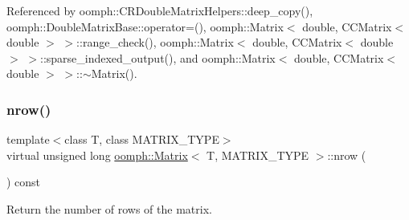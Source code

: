Referenced by oomph\+::\+C\+R\+Double\+Matrix\+Helpers\+::deep\+\_\+copy(), oomph\+::\+Double\+Matrix\+Base\+::operator=(), oomph\+::\+Matrix$<$ double, C\+C\+Matrix$<$ double $>$ $>$\+::range\+\_\+check(), oomph\+::\+Matrix$<$ double, C\+C\+Matrix$<$ double $>$ $>$\+::sparse\+\_\+indexed\+\_\+output(), and oomph\+::\+Matrix$<$ double, C\+C\+Matrix$<$ double $>$ $>$\+::$\sim$\+Matrix().

\mbox{\label{classoomph_1_1Matrix_ac366ca5324d3e00e23d9800f3d5f4d5f}} 
\subsubsection{\texorpdfstring{nrow()}{nrow()}}
{\footnotesize\ttfamily template$<$class T, class M\+A\+T\+R\+I\+X\+\_\+\+T\+Y\+PE$>$ \\
virtual unsigned long \hyperlink{classoomph_1_1Matrix}{oomph\+::\+Matrix}$<$ T, M\+A\+T\+R\+I\+X\+\_\+\+T\+Y\+PE $>$\+::nrow (\begin{DoxyParamCaption}{ }\end{DoxyParamCaption}) const\hspace{0.3cm}{\ttfamily [pure virtual]}}



Return the number of rows of the matrix. 




